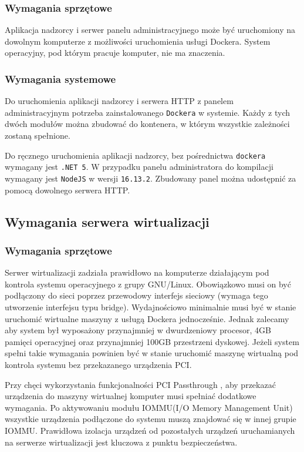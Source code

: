 \documentclass[../opis-rozwiazania.tex]{subfiles}
\begin{document}
\subsubsection{Wymagania sprzętowe}
Aplikacja nadzorcy i serwer panelu administracyjnego może być uruchomiony na dowolnym komputerze z możliwości uruchomienia usługi Dockera.
System operacyjny, pod którym pracuje komputer, nie ma znaczenia.

\subsubsection{Wymagania systemowe}
Do uruchomienia aplikacji nadzorcy i serwera HTTP z panelem administracyjnym potrzeba zainstalowanego \texttt{Dockera} w systemie.
Każdy z tych dwóch modułów można zbudować do kontenera, w którym wszystkie zależności zostaną spełnione.

Do ręcznego uruchomienia aplikacji nadzorcy, bez pośrednictwa \texttt{dockera} wymagany jest \texttt{.NET 5}. W przypadku panelu administratora do kompilacji wymagany jest \texttt{NodeJS} w wersji \texttt{16.13.2}. Zbudowany panel można udostępnić za pomocą dowolnego serwera HTTP.

\subsection{Wymagania serwera wirtualizacji}
\label{system_requirements.virtsrv_rquirements}

\subsubsection{Wymagania sprzętowe}
Serwer wirtualizacji zadziała prawidłowo na komputerze działającym pod kontrola systemu operacyjnego z grupy GNU/Linux.
Obowiązkowo musi on być podłączony do sieci poprzez przewodowy interfejs sieciowy (wymaga tego utworzenie interfejsu typu bridge).
Wydajnościowo minimalnie musi być w stanie uruchomić wirtualne maszyny z usługą Dockera jednocześnie.
Jednak zalecamy aby system był wyposażony przynajmniej w dwurdzeniowy procesor, 4GB pamięci operacyjnej oraz przynajmniej 100GB przestrzeni dyskowej.
Jeżeli system spełni takie wymagania powinien być w stanie uruchomić maszynę wirtualną pod kontrola systemu bez przekazanego urządzenia PCI.

Przy chęci wykorzystania funkcjonalności PCI Passthrough \parencite{pci-passthrough}, aby przekazać urządzenia do maszyny wirtualnej komputer musi spełniać dodatkowe wymagania.
Po aktywowaniu modułu IOMMU(I/O Memory Management Unit) \parencite{amd-iommu} wszystkie urządzenia podłączone do systemu muszą znajdować się w innej grupie IOMMU.
Prawidłowa izolacja urządzeń od pozostałych urządzeń uruchamianych na serwerze wirtualizacji jest kluczowa z punktu bezpieczeństwa.
\end{document}
